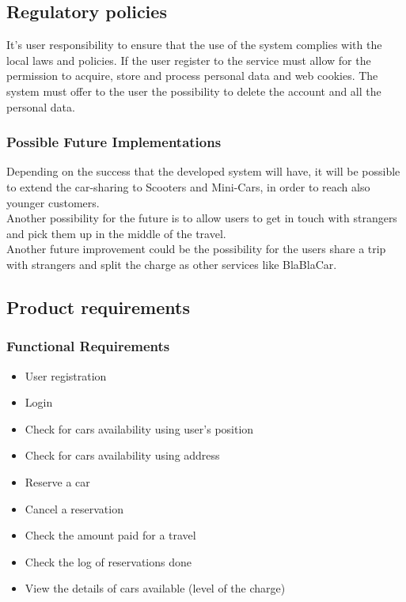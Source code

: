 \subsection{Regulatory policies}
It’s user responsibility to ensure that the use of the system complies with the local laws and policies. If the user register to the service must allow for the permission to acquire, store and process personal data and web cookies. The system must offer to the user the possibility to delete the account and all the personal data.


\subsubsection{Possible Future Implementations}
Depending on the success that the developed system will have, it will be possible to extend the car-sharing to Scooters and Mini-Cars, in order to reach also younger customers.
\\ \noindent 
Another possibility for the future is to allow users to get in touch with strangers and pick them up in the middle of the travel.
\\Another future improvement could be the possibility for the users share a trip with strangers and split the charge as other services like BlaBlaCar. 
\pagebreak{}

\subsection{Product requirements}
\subsubsection{Functional Requirements}

\begin{itemize}
	\item User registration
	\item Login
	\item Check for cars availability using user's position
	\item Check for cars availability using address
	\item Reserve a car
	\item Cancel a reservation
	\item Check the amount paid for a travel
	\item Check the log of reservations done
	\item View the details of cars available (level of the charge)
	
	
\end{itemize}


